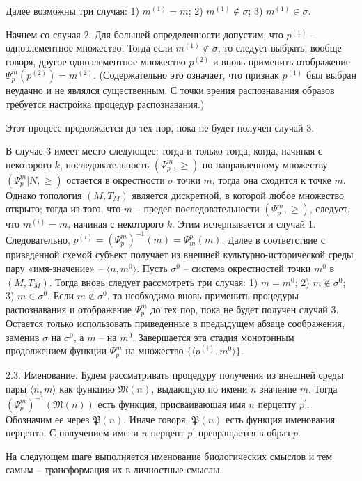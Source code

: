 Далее возможны три случая:
1) $m^{(1)}=m$;
2) $m^{(1)}\not\in\sigma$;
3) $m^{(1)}\in\sigma$.

Начнем со случая 2. Для большей определенности допустим, что $p^{(1)}$ – одноэлементное множество. Тогда если $m^{(1)}\not\in\sigma$, то следует выбрать, вообще говоря, другое одноэлементное множество $p^{(2)}$ и вновь применить отображение $\Psi_p^m(p^{(2)})=m^{(2)}$. (Содержательно это означает, что признак $p^{(1)}$ был выбран неудачно и не являлся существенным. С точки зрения распознавания образов требуется настройка процедур распознавания.)

Этот процесс продолжается до тех пор, пока не будет получен случай 3.

В случае 3 имеет место следующее: тогда и только тогда, когда, начиная с некоторого $k$, последовательность $(\Psi_p^m,\geqslant)$ по направленному множеству $(\Psi_p^m | N,\geqslant)$ остается в окрестности $\sigma$ точки $m$, тогда она сходится к точке $m$. Однако топология $(M,T_M)$ является дискретной, в которой любое множество открыто; тогда из того, что $m$ – предел последовательности $(\Psi_p^m,\geqslant)$, следует, что $m^{(i)}=m$, начиная с некоторого $k$. Этим исчерпывается и случай 1. Следовательно, $p^{(i)}={(\Psi_p^m)}^{-1}(m)=\Psi_m^p(m)$.
Далее в соответствие с приведенной схемой субъект получает из внешней культурно-исторической среды пару «имя-значение» – $\langle n,m^0\rangle$. Пусть $\sigma^0$ – система окрестностей точки $m^0$ в $(M,T_M)$. Тогда вновь следует рассмотреть три случая:
1) $m=m^0$;
2) $m\not\in\sigma^0$;
3) $m\in\sigma^0$.
Если $m\not\in\sigma^0$, то необходимо вновь применить процедуры распознавания и отображение $\Psi_p^m$ до тех пор, пока не будет получен случай 3. Остается только использовать приведенные в предыдущем абзаце соображения, заменив $\sigma$ на $\sigma^0$, а $m$ – на $m^0$.
Завершается эта стадия монотонным продолжением функции $\Psi_p^m$ на множество $\{\langle p^{(i)},m^0\rangle\}$.

2.3. Именование. Будем рассматривать процедуру получения из внешней среды пары $\langle n,m\rangle$ как функцию $\mathfrak M(n)$, выдающую по имени $n$ значение $m$. Тогда ${(\Psi_p^m)}^{-1}(\mathfrak M(n))$ есть функция, присваивающая имя $n$ перцепту $p^\prime$. Обозначим ее через $\mathfrak P(n)$. Иначе говоря, $\mathfrak P(n)$ есть функция именования перцепта. С получением имени $n$ перцепт $p^\prime$ превращается в образ $p$.

На следующем шаге выполняется именование биологических смыслов и тем самым – трансформация их в личностные смыслы.

